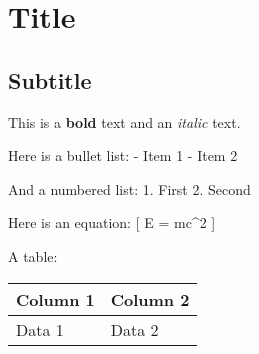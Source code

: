 \section{Title}\label{title}

\subsection{Subtitle}\label{subtitle}

This is a \textbf{bold} text and an \emph{italic} text.

Here is a bullet list: - Item 1 - Item 2

And a numbered list: 1. First 2. Second

Here is an equation: {[} E = mc\^{}2 {]}

A table:

\begin{longtable}[]{@{}ll@{}}
\toprule\noalign{}
Column 1 & Column 2 \\
\midrule\noalign{}
\endhead
\bottomrule\noalign{}
\endlastfoot
Data 1 & Data 2 \\
\end{longtable}
